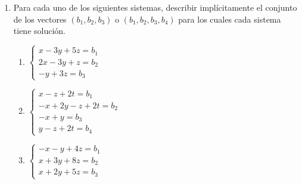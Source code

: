 \begin{enumerate}[topsep=6pt, itemsep=.4cm]
\item\label{sistemas con soluciones} Para cada uno de los siguientes sistemas, describir implícitamente el conjunto de los vectores $(b_1,b_2,b_3)$
o $(b_1,b_2,b_3,b_4)$ para los cuales cada sistema tiene solución.
\begin{multicols}{3}
\begin{enumerate}
\item $\begin{cases}
 x - 3y + 5z = b_1\\
 2x-3y+z = b_2\\
 -y + 3z = b_3
\end{cases}$
\item $\begin{cases}
x-z+2t = b_1\\
-x+2y-z+2t = b_2\\
-x+y = b_3\\
y-z+2t=b_4
\end{cases}$
\item $\begin{cases}
 - x - y + 4 z = b_1\\
 x+3y+8z = b_2\\
 x + 2y + 5z = b_3
\end{cases}$
\end{enumerate}
\end{multicols}

\rta


\end{enumerate}
